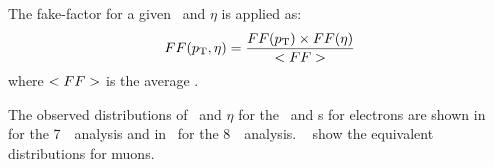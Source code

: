 The fake-factor for a given \pT\ and $\eta$ is applied as:
\begin{equation}
FF(p_{\mathrm{T}},\eta) = \frac{FF(p_{\mathrm{T}})\times FF(\eta)}{<FF>}
\label{eqn:factorised-ff}
\end{equation}
where $<FF>$ is the average \ffactor.

The observed distributions of \pT\ and $\eta$ for the \sellep\ and \lljet s for
electrons are shown in~ for the
7~\tev\ analysis and in~ for the 8~\tev\ analysis.
~ show the equivalent distributions for
muons.


